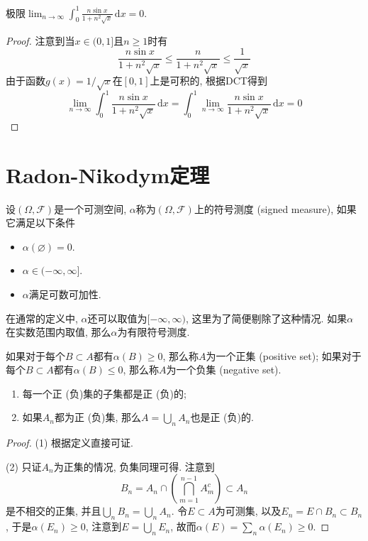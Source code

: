 \documentclass[cn, 12pt, math=mtpro2, bibstyle=apa, blue, twocol]{elegantbook}
\newcommand{\F}{\mathcal{F}}
\newcommand{\limn}{\lim_{n\to\infty}}
\let\emptyset\varnothing
\begin{document}
\begin{example}
极限$\displaystyle \limn \int_{0}^{1}\frac{n\sin x}{1+n^2\sqrt{x}}\,\text{d}x=0$.
\end{example}
\begin{proof}
  注意到当$x\in (0,1]$且$n\ge1$时有
  $$\frac{n\sin x}{1+n^2\sqrt{x}}\leq \frac{n}{1+n^2\sqrt{x}}\leq \frac{1}{\sqrt{x}}$$
  由于函数$g(x)=1/\sqrt{x}$在$[0,1]$上是可积的, 根据DCT得到
  $$\limn\int_{0}^{1}\frac{n\sin x}{1+n^2\sqrt{x}}\,\text{d}x=\int_{0}^{1}\limn \frac{n\sin x}{1+n^2\sqrt{x}}\,\text{d}x=0$$

\end{proof}
\section{Radon-Nikodym定理}
\begin{definition}
设$(\Omega,\F)$是一个可测空间, $\alpha$称为$(\Omega,\F)$上的符号测度 (signed measure), 如果它满足以下条件
\begin{itemize}
  \item $\alpha(\emptyset)=0$.
  \item $\alpha\in(-\infty,\infty]$.
  \item $\alpha$满足可数可加性.
\end{itemize}
\end{definition}
\begin{remark}
在通常的定义中, $\alpha$还可以取值为$[-\infty,\infty)$, 这里为了简便剔除了这种情况. 如果$\alpha$在实数范围内取值, 那么$\alpha$为有限符号测度.
\end{remark}

\begin{definition}
如果对于每个$B\subset A$都有$\alpha(B)\ge0$, 那么称$A$为一个正集 (positive set); 如果对于每个$B\subset A$都有$\alpha(B)\le0$, 那么称$A$为一个负集 (negative set).
\end{definition}

\begin{lemma}\label{lem:lem1.6}
\begin{enumerate}[label=(\arabic*)]
  \item 每一个正 (负)集的子集都是正 (负)的;
  \item 如果$A_n$都为正 (负)集, 那么$A=\bigcup_nA_n$也是正 (负)的.
\end{enumerate}
\end{lemma}
\begin{proof}
  (1) 根据定义直接可证.

  (2) 只证$A_n$为正集的情况, 负集同理可得. 注意到
  $$B_n=A_n\cap \left(\bigcap_{m=1}^{n-1}A_m^c\right)\subset A_n$$
  是不相交的正集, 并且$\bigcup_nB_n=\bigcup_nA_n$. 令$E\subset A$为可测集, 以及$E_n=E\cap B_n \subset B_n$, 于是$\alpha(E_n)\ge0$, 注意到$E=\bigcup_nE_n$, 故而$\alpha(E)=\sum_n \alpha(E_n)\ge0$.
\end{proof}
\end{document}
